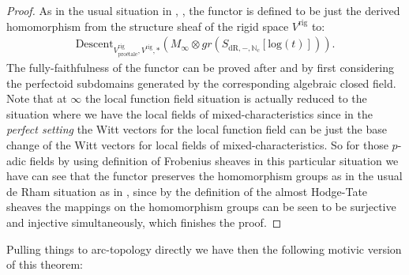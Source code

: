 \documentclass[12pt]{article}
\theoremstyle{definition}
\begin{document}
\begin{proof}
As in the usual situation in \cite{5L}, \cite{5BLA}, \cite{5BLB} the functor is defined to be just the derived homomorphism from the structure sheaf of the rigid space $V^\mathrm{rig}$ to:
\begin{align}
\mathrm{Descent}_{V^\mathrm{rig}_\text{pro\'etale},V^\mathrm{rig},*}(M_\infty\otimes gr(S_{\mathrm{dR},-,\mathbb{N}_c}[\mathrm{log}(t)])).
\end{align}
The fully-faithfulness of the functor can be proved after \cite{5BLA} and \cite{5BLB} by first considering the perfectoid subdomains generated by the corresponding algebraic closed field. Note that at $\infty$ the local function field situation is actually reduced to the situation where we have the local fields of mixed-characteristics since in the \textit{perfect setting} the Witt vectors for the local function field can be just the base change of the Witt vectors for local fields of mixed-characteristics. So for those $p$-adic fields by using definition of Frobenius sheaves in this particular situation we have can see that the functor preserves the homomorphism groups as in the usual de Rham situation as in \cite{5KLB}, since by the definition of the almost Hodge-Tate sheaves the mappings on the homomorphism groups can be seen to be surjective and injective simultaneously, which finishes the proof.
\end{proof}

Pulling things to arc-topology directly we have then the following motivic version of this theorem:
\end{document}
